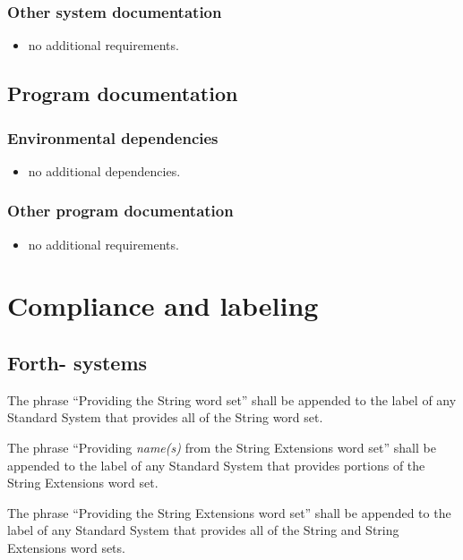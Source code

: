\subsubsection{Other system documentation}
\begin{itemize}
\item no additional requirements.
\end{itemize}

\subsection{Program documentation}

\subsubsection{Environmental dependencies}
\begin{itemize}
\item no additional dependencies.
\end{itemize}

\subsubsection{Other program documentation}
\begin{itemize}
\item no additional requirements.
\end{itemize}

\section{Compliance and labeling} %

\subsection{Forth-\snapshot{} systems} %

The phrase ``Providing the String word set'' shall be appended to
the label of any Standard System that provides all of the String
word set.

The phrase ``Providing \emph{name(s)} from the String Extensions
word set'' shall be appended to the label of any Standard System
that provides portions of the String Extensions word set.

The phrase ``Providing the String Extensions word set'' shall be
appended to the label of any Standard System that provides all of
the String and String Extensions word sets.

